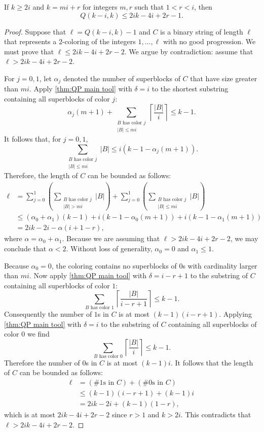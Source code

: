 \begin{theorem} \label{thm:GeneralUpperBound} If $k \geq 2i$ and $k=mi+r$ for integers $m,r$ such that $1 < r < i$, then \[Q(k-i,k) \leq 2ik-4i+2r-1.\]
\end{theorem}
\begin{proof} 
Suppose that $\ell = Q(k-i,k) - 1$ and $C$ is a binary string of length $\ell$ that represents a $2$-coloring of the integers $1,\ldots,\ell$ with no good progression. We must prove that $\ell \leq 2ik-4i+2r-2$. We argue by contradiction: assume that $\ell > 2ik-4i+2r-2$.

For $j=0,1$, let $\alpha_j$ denoted the number of superblocks of $C$ that have size greater than $mi$. Apply \autoref{thm:QP main tool} with $\delta = i$ to the shortest substring containing all superblocks of color $j$: \[\alpha_j (m+1) + \sum_{\substack{\text{$B$ has color $j$}\\ |B| \leq mi}} \left\lceil \frac{|B|}{i} \right\rceil \leq k-1.\] It follows that, for $j=0,1$, \[\sum_{\substack{\text{$B$ has color $j$}\\ |B| \leq mi}} |B| \leq i(k - 1 - \alpha_j (m+1)).\] Therefore, the length of $C$ can be bounded as follows:
\begin{align*}
\ell &= \sum_{j=0}^1 \left( \sum_{\substack{\text{$B$ has color $j$}\\ |B| > mi}} |B| \right) + \sum_{j=0}^1 \left( \sum_{\substack{\text{$B$ has color $j$}\\ |B| \leq mi}}  |B| \right) \\
 &\leq (\alpha_0 + \alpha_1)(k-1) + i(k - 1 - \alpha_0 (m+1)) + i(k - 1 - \alpha_1 (m+1)) \\
 &= 2ik - 2i - \alpha(i+1 - r),
\end{align*}
where $\alpha = \alpha_0 + \alpha_1$. Because we are assuming that $\ell > 2ik-4i+2r-2$, we may conclude that $\alpha < 2$. Without loss of generality, $\alpha_0=0$ and $\alpha_1 \leq 1$.

Because $\alpha_0=0$, the coloring contains no superblocks of $0$s with cardinality larger than $mi$. Now apply \autoref{thm:QP main tool} with $\delta = i-r+1$ to the substring of $C$ containing all superblocks of color $1$: \[\sum_{\text{$B$ has color $1$}} \left\lceil \frac{|B|}{i-r+1} \right\rceil \leq k-1.\] Consequently the number of $1$s in $C$ is at most $(k-1)(i-r+1)$. Applying \autoref{thm:QP main tool} with $\delta = i$ to the substring of $C$ containing all superblocks of color $0$ we find \[\sum_{\text{$B$ has color $0$}} \left\lceil \frac{|B|}{i} \right\rceil \leq k-1.\] Therefore the number of $0$s in $C$ is at most $(k-1)i$. It follows that the length of $C$ can be bounded as follows:
\begin{align*}
	\ell	&= \left(\# 1\mbox{s in }C \right) + \left( \# 0\mbox{s in }C \right) \\
		&\leq (k-1)(i-r+1) +  (k-1)i\\
		&= 2ik - 2i +(k-1)(1 - r),
\end{align*}
which is at most $2ik-4i+2r-2$ since $r > 1$ and $k > 2i$. This contradicts that $\ell > 2ik-4i+2r-2$. 
\end{proof}

